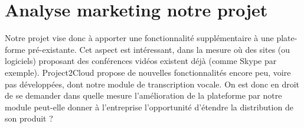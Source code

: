 


\section{Analyse marketing notre projet}
	Notre projet vise donc à apporter une fonctionnalité supplémentaire à une plate-forme pré-existante. Cet aspect est intéressant, dans la mesure où des sites (ou logiciels) proposant des conférences vidéos existent déjà (comme Skype par exemple). Project2Cloud propose de nouvelles fonctionnalités encore peu, voire pas développées, dont notre module de transcription vocale. On est donc en droit de se demander dans quelle mesure l'amélioration de la plateforme par notre module peut-elle donner à l'entreprise l'opportunité d'étendre la distribution de son produit ?
	